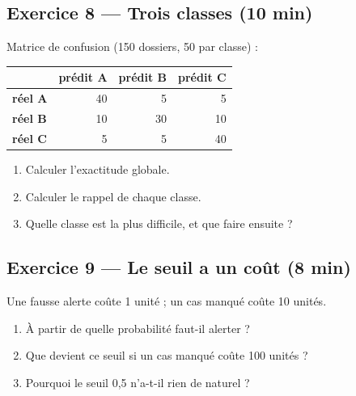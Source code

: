 \subsection*{Exercice 8 --- Trois classes \hfill \normalfont\footnotesize (10 min)}
Matrice de confusion (150 dossiers, 50 par classe) :

\begin{center}
\small
\begin{tabular}{@{}lrrr@{}}
\toprule
 & \textbf{prédit A} & \textbf{prédit B} & \textbf{prédit C} \\
\midrule
\textbf{réel A} & 40 & 5 & 5 \\
\textbf{réel B} & 10 & 30 & 10 \\
\textbf{réel C} & 5 & 5 & 40 \\
\bottomrule
\end{tabular}
\end{center}

\begin{enumerate}
  \item Calculer l'exactitude globale.
  \item Calculer le rappel de chaque classe.
  \item Quelle classe est la plus difficile, et que faire ensuite ?
\end{enumerate}

\subsection*{Exercice 9 --- Le seuil a un coût \hfill \normalfont\footnotesize (8 min)}
Une fausse alerte coûte 1 unité ; un cas manqué coûte 10 unités.
\begin{enumerate}
  \item À partir de quelle probabilité faut-il alerter ?
  \item Que devient ce seuil si un cas manqué coûte 100 unités ?
  \item Pourquoi le seuil 0,5 n'a-t-il rien de naturel ?
\end{enumerate}

\newpage

